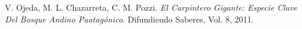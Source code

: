 %

%

\begin{thebibliography}{9}
V. Ojeda, M. L. Chazarreta, C. M. Pozzi. \textit{El Carpintero Gigante: Especie Clave Del Bosque Andino Paatagónico}. Difundiendo Saberes, Vol. 8, 2011.

\end{thebibliography}

%
